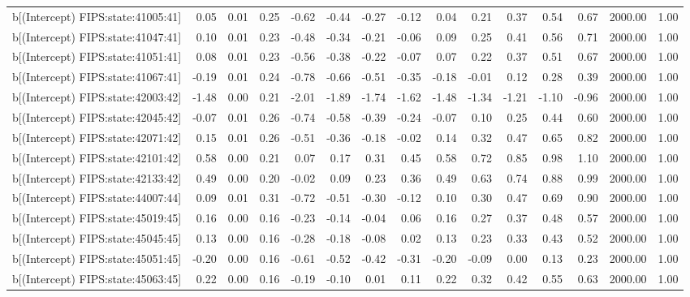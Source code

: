 \begin{table}[ht]
\begin{tabular}{rrrrrrrrrrrrrrr}
  b[(Intercept) FIPS:state:41005:41] & 0.05 & 0.01 & 0.25 & -0.62 & -0.44 & -0.27 & -0.12 & 0.04 & 0.21 & 0.37 & 0.54 & 0.67 & 2000.00 & 1.00 \\ 
  b[(Intercept) FIPS:state:41047:41] & 0.10 & 0.01 & 0.23 & -0.48 & -0.34 & -0.21 & -0.06 & 0.09 & 0.25 & 0.41 & 0.56 & 0.71 & 2000.00 & 1.00 \\ 
  b[(Intercept) FIPS:state:41051:41] & 0.08 & 0.01 & 0.23 & -0.56 & -0.38 & -0.22 & -0.07 & 0.07 & 0.22 & 0.37 & 0.51 & 0.67 & 2000.00 & 1.00 \\ 
  b[(Intercept) FIPS:state:41067:41] & -0.19 & 0.01 & 0.24 & -0.78 & -0.66 & -0.51 & -0.35 & -0.18 & -0.01 & 0.12 & 0.28 & 0.39 & 2000.00 & 1.00 \\ 
  b[(Intercept) FIPS:state:42003:42] & -1.48 & 0.00 & 0.21 & -2.01 & -1.89 & -1.74 & -1.62 & -1.48 & -1.34 & -1.21 & -1.10 & -0.96 & 2000.00 & 1.00 \\ 
  b[(Intercept) FIPS:state:42045:42] & -0.07 & 0.01 & 0.26 & -0.74 & -0.58 & -0.39 & -0.24 & -0.07 & 0.10 & 0.25 & 0.44 & 0.60 & 2000.00 & 1.00 \\ 
  b[(Intercept) FIPS:state:42071:42] & 0.15 & 0.01 & 0.26 & -0.51 & -0.36 & -0.18 & -0.02 & 0.14 & 0.32 & 0.47 & 0.65 & 0.82 & 2000.00 & 1.00 \\ 
  b[(Intercept) FIPS:state:42101:42] & 0.58 & 0.00 & 0.21 & 0.07 & 0.17 & 0.31 & 0.45 & 0.58 & 0.72 & 0.85 & 0.98 & 1.10 & 2000.00 & 1.00 \\ 
  b[(Intercept) FIPS:state:42133:42] & 0.49 & 0.00 & 0.20 & -0.02 & 0.09 & 0.23 & 0.36 & 0.49 & 0.63 & 0.74 & 0.88 & 0.99 & 2000.00 & 1.00 \\ 
  b[(Intercept) FIPS:state:44007:44] & 0.09 & 0.01 & 0.31 & -0.72 & -0.51 & -0.30 & -0.12 & 0.10 & 0.30 & 0.47 & 0.69 & 0.90 & 2000.00 & 1.00 \\ 
  b[(Intercept) FIPS:state:45019:45] & 0.16 & 0.00 & 0.16 & -0.23 & -0.14 & -0.04 & 0.06 & 0.16 & 0.27 & 0.37 & 0.48 & 0.57 & 2000.00 & 1.00 \\ 
  b[(Intercept) FIPS:state:45045:45] & 0.13 & 0.00 & 0.16 & -0.28 & -0.18 & -0.08 & 0.02 & 0.13 & 0.23 & 0.33 & 0.43 & 0.52 & 2000.00 & 1.00 \\ 
  b[(Intercept) FIPS:state:45051:45] & -0.20 & 0.00 & 0.16 & -0.61 & -0.52 & -0.42 & -0.31 & -0.20 & -0.09 & 0.00 & 0.13 & 0.23 & 2000.00 & 1.00 \\ 
  b[(Intercept) FIPS:state:45063:45] & 0.22 & 0.00 & 0.16 & -0.19 & -0.10 & 0.01 & 0.11 & 0.22 & 0.32 & 0.42 & 0.55 & 0.63 & 2000.00 & 1.00 \\ 

\end{tabular}
\end{table}
